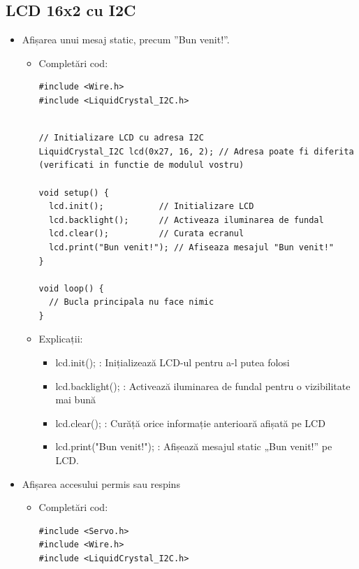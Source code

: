 \documentclass{report}
\begin{document}
\subsection{LCD 16x2 cu I2C}
\begin{itemize}
    \item Afișarea unui mesaj static, precum ”Bun venit!”.
    \begin{itemize}
        \item Completări cod:
            \begin{lstlisting}
#include <Wire.h>
#include <LiquidCrystal_I2C.h>
\end{lstlisting}
\newpage
\vspace*{1cm}
\begin{lstlisting}

// Initializare LCD cu adresa I2C
LiquidCrystal_I2C lcd(0x27, 16, 2); // Adresa poate fi diferita (verificati in functie de modulul vostru)

void setup() {
  lcd.init();           // Initializare LCD
  lcd.backlight();      // Activeaza iluminarea de fundal
  lcd.clear();          // Curata ecranul
  lcd.print("Bun venit!"); // Afiseaza mesajul "Bun venit!"
}

void loop() {
  // Bucla principala nu face nimic
}

            \end{lstlisting}
            \item Explicații:
            \begin{itemize}
                \item lcd.init(); : Inițializează LCD-ul pentru a-l putea folosi
                \item lcd.backlight(); : Activează iluminarea de fundal pentru o vizibilitate mai bună
                \item lcd.clear(); : Curăță orice informație anterioară afișată pe LCD
                \item lcd.print("Bun venit!"); : Afișează mesajul static „Bun venit!” pe LCD.
            \end{itemize}
    \end{itemize}
    \item Afișarea accesului permis sau respins
    \begin{itemize}
        \item Completări cod:
            \begin{lstlisting}
#include <Servo.h>
#include <Wire.h>
#include <LiquidCrystal_I2C.h>


\end{lstlisting}
\end{itemize}
\end{itemize}
\end{document}
